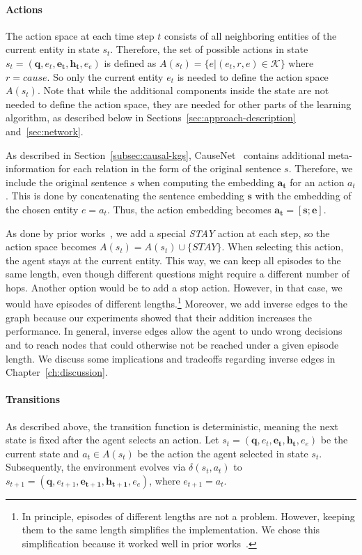 \paragraph{Actions} The action space at each time step $t$ consists of all neighboring
entities of the current entity in state $s_t$. Therefore, the set of possible actions in 
state $s_t = (\mathbf{q}, e_t, \mathbf{e_t}, \mathbf{h_t}, e_e)$ is defined as $A(s_t) = \{e | (e_t, r, e) \in \mathcal{K}\}$ where $r = cause$.
So only the current entity $e_t$ is needed to define the
action space $A(s_t)$. Note that while the additional components inside the state
are not needed to define the action space, they are needed for other parts 
of the learning algorithm, as described below in 
 Sections~\ref{sec:approach-description} and~\ref{sec:network}. 

 As described in Section~\ref{subsec:causal-kgs}, CauseNet~\cite{Heindorf2020Causenet} contains
 additional meta-information for each relation in the form of the original sentence $s$.
 Therefore, we include the original sentence $s$ when computing the embedding $\mathbf{a_t}$ for an action $a_t$.
 This is done by concatenating the sentence embedding $\mathbf{s}$ with the embedding of the chosen
 entity $e = a_t$. Thus, the action embedding becomes $\mathbf{a_t} = [\mathbf{s};\mathbf{e}]$.

As done by prior works~\cite{Das2018Minerva, Lin2020RewardShaping, Qiu2020Stepwise}, we add a special \textit{STAY} action at each step, so the action space becomes $A(s_t) = A(s_t) \cup \{STAY\}$. 
When selecting this action, the agent stays at the current entity. This way, we can keep 
all episodes to the same length, even though different questions might require a different
 number of hops. Another option would be to add a stop action. However, in that case,
 we would have episodes of different lengths.\footnote{In principle, episodes of different lengths are not a problem. However, keeping them to the same length simplifies the implementation. We chose this simplification because it worked well in prior works~\cite{Das2018Minerva, Qiu2020Stepwise}.}
 Moreover, we add inverse edges to the graph because our experiments showed that 
 their addition increases the performance. In general, inverse edges allow the agent to undo wrong decisions and to reach nodes 
 that could otherwise not be reached under a given episode length. We discuss some implications and tradeoffs regarding 
 inverse edges in Chapter~\ref{ch:discussion}.

\paragraph{Transitions}
As described above, the transition function is deterministic, meaning the next 
state is fixed after the agent 
selects an action. Let $s_t=(\mathbf{q}, e_t, \mathbf{e_t}, \mathbf{h_t}, e_e)$ be the 
current state and $a_t \in A(s_t)$ be the action the agent selected in state $s_t$.
Subsequently, the environment evolves via $\delta(s_t, a_t)$ to $s_{t+1}=(\mathbf{q}, e_{t+1}, \mathbf{e_{t+1}}, \mathbf{h_{t+1}}, e_e)$,
where $e_{t+1}=a_t$.  

